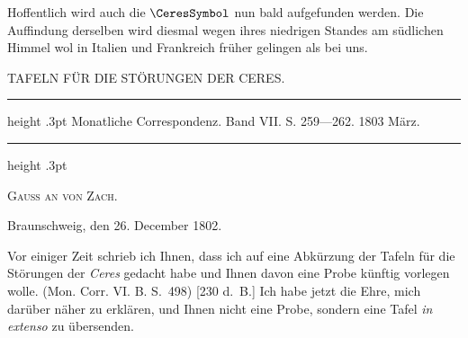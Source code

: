 Hoffentlich wird auch die $\CeresSymbol$ nun bald aufgefunden werden. Die Auffindung derselben wird diesmal wegen ihres niedrigen Standes am südlichen Himmel wol in Italien und Frankreich früher gelingen als bei uns.

\par\medskip
{}
\begin{center}\large TAFELN FÜR DIE STÖRUNGEN DER CERES.\end{center}
\begin{center}\parbox{.87\linewidth}{\centering\footnotesize\frenchspacing
\hrule height .3pt\relax\vspace{2.5pt}
Monatliche Correspondenz. Band VII. S. 259—262. 1803 März.\par
\vspace{2.5pt}\hrule height .3pt\relax
}\end{center}
\begin{center}\textsc{Gauss an von Zach.}\end{center}
\begin{flushright}Braunschweig, den 26. December 1802.\end{flushright}

Vor einiger Zeit schrieb ich Ihnen, dass ich auf eine Abkürzung der Tafeln für die Störungen der \textit{Ceres} gedacht habe und Ihnen davon eine Probe künftig vorlegen wolle. (Mon. Corr. VI. B. S.\ 498) [230 d.\ B.] Ich habe jetzt die Ehre, mich darüber näher zu erklären, und Ihnen nicht eine Probe, sondern eine Tafel \textit{in extenso} zu übersenden.

